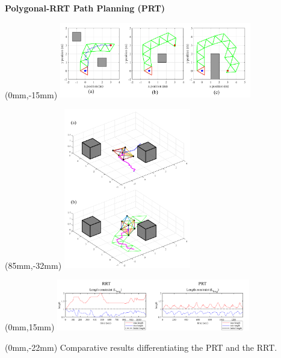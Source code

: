 \documentclass[11pt,aspectratio=169]{beamer}
\begin{document}
\begin{frame}[fragile]{\textbf{Polygonal-RRT Path Planning (PRT)}}
    
        \begin{textblock*}{5cm}(0mm,-15mm) %
        \href{https://youtu.be/LATWgYy7ye0?si=a48bX9n5iTIcAjNj&t=29}{
        \includegraphics[height=33mm]{elements/[17]-PRT.png}}
        \end{textblock*}

        \begin{textblock*}{5cm}(85mm,-32mm) %
        \includegraphics[height=70mm]{elements/[16]-PRT.png}
        \end{textblock*}

        \begin{textblock*}{5cm}(0mm,15mm) %
        \includegraphics[height=22.2mm]{elements/[18]-PRT.png}
        \end{textblock*}
        
        \begin{textblock*}{130mm}(0mm,-22mm)
        Comparative results differentiating the PRT and the RRT. 
        \end{textblock*}


\end{frame}
\end{document}
